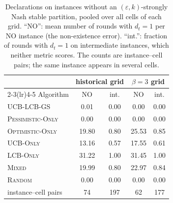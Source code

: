 \begin{table}[h]
\centering\small\setlength{\tabcolsep}{3pt}
\caption{Declarations on instances without an $(\varepsilon,k)$-strongly Nash stable partition, pooled over all cells of each grid. ``NO'': mean number of rounds with $d_t=1$ per NO instance (the non-existence error). ``int.'': fraction of rounds with $d_t=1$ on intermediate instances, which neither metric scores. The counts are instance--cell pairs; the same instance appears in several cells.}
\label{tab:no-instances}
\begin{tabular}{lcccc}
\toprule
& \multicolumn{2}{c}{historical grid} & \multicolumn{2}{c}{$\beta=3$ grid} \\ \cmidrule(lr){2-3}\cmidrule(lr){4-5}
Algorithm & NO & int. & NO & int. \\
\midrule
\textsc{UCB-LCB-GS} & 0.01 & 0.00 & 0.00 & 0.00 \\
\textsc{Pessimistic-Only} & 0.00 & 0.00 & 0.00 & 0.00 \\
\textsc{Optimistic-Only} & 19.80 & 0.80 & 25.53 & 0.85 \\
\textsc{UCB-Only} & 13.16 & 0.57 & 17.55 & 0.61 \\
\textsc{LCB-Only} & 31.22 & 1.00 & 31.45 & 1.00 \\
\textsc{Mixed} & 19.99 & 0.80 & 22.97 & 0.84 \\
\textsc{Random} & 0.00 & 0.00 & 0.00 & 0.00 \\
\midrule
instance--cell pairs & 74 & 197 & 62 & 177 \\
\bottomrule
\end{tabular}
\end{table}
